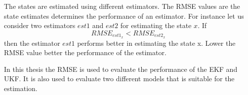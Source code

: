 The states are estimated using different estimators. The RMSE values are the state estimates determines the performance of an estimator. For instance let us consider two estimators $est1$ and $est2$ for estimating the state $x$. If $$ {RMSE}_{est1_{x}} < {RMSE}_{est2_{x}} $$ then the estimator $est1$ performs better in estimating the state x. Lower the RMSE value better the performance of the estimator.

In this thesis the RMSE is used to evaluate the performance of the EKF and UKF. It is also used to evaluate two different models that is suitable for the estimation.
